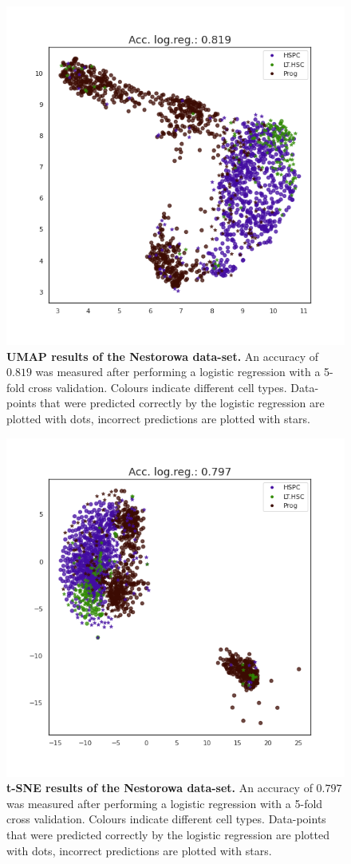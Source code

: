 \begin{figure}
    \centering
    \includegraphics[width=.6\linewidth]{figs/nestorowa_UMAP_logres.png}
    \caption[UMAP results of the Nestorowa data-set.]{\small \textbf{UMAP results of the Nestorowa data-set.} \small An accuracy of $0.819$ was measured after performing a logistic regression with a 5-fold cross validation. Colours indicate different cell types. Data-points that were predicted correctly by the logistic regression are plotted with dots, incorrect predictions are plotted with stars.}
    \label{fig:nestorowa_umap}
\end{figure}

\begin{figure}
    \centering
    \includegraphics[width=.6\linewidth]{figs/nestorowa_tsne_logres.png}
    \caption[t-SNE results of the Nestorowa data-set.]{\small \textbf{t-SNE results of the Nestorowa data-set.} \small An accuracy of $0.797$ was measured after performing a logistic regression with a 5-fold cross validation. Colours indicate different cell types. Data-points that were predicted correctly by the logistic regression are plotted with dots, incorrect predictions are plotted with stars.}
    \label{fig:nestorowa_tsne}
\end{figure}

